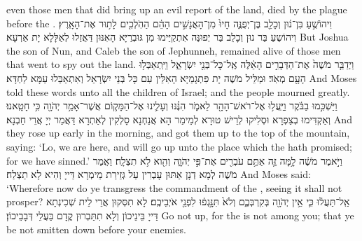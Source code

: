 {even those men that did bring up an evil report of the land, died by the plague before the \lord.}{}
{וִיהוֹשֻׁ֣עַ בִּן־נ֔וּן וְכָלֵ֖ב בֶּן־יְפֻנֶּ֑ה חָיוּ֙ מִן־הָאֲנָשִׁ֣ים הָהֵ֔ם הַהֹֽלְכִ֖ים לָת֥וּר אֶת־הָאָֽרֶץ׃
}
{וִיהוֹשֻעַ בַּר נוּן וְכָלֵב בַּר יְפוּנֶּה אִתְקַיַּימוּ מִן גּוּבְרַיָּא הָאִנּוּן דַּאֲזַלוּ לְאַלָּלָא יָת אַרְעָא׃}
{But Joshua the son of Nun, and Caleb the son of Jephunneh, remained alive of those men that went to spy out the land.}{}
{וַיְדַבֵּ֤ר מֹשֶׁה֙ אֶת־הַדְּבָרִ֣ים הָאֵ֔לֶּה אֶֽל־כׇּל־בְּנֵ֖י יִשְׂרָאֵ֑ל וַיִּֽתְאַבְּל֥וּ הָעָ֖ם מְאֹֽד׃}
{וּמַלֵּיל מֹשֶׁה יָת פִּתְגָמַיָּא הָאִלֵּין עִם כָּל בְּנֵי יִשְׂרָאֵל וְאִתְאַבַּלוּ עַמָּא לַחְדָּא׃}
{And Moses told these words unto all the children of Israel; and the people mourned greatly.}{}
{וַיַּשְׁכִּ֣מוּ בַבֹּ֔קֶר וַיַּֽעֲל֥וּ אֶל־רֹאשׁ־הָהָ֖ר לֵאמֹ֑ר הִנֶּ֗נּוּ וְעָלִ֛ינוּ אֶל־הַמָּק֛וֹם אֲשֶׁר־אָמַ֥ר יְהֹוָ֖ה כִּ֥י חָטָֽאנוּ׃
}
{וְאַקְדִּימוּ בְצַפְרָא וּסְלִיקוּ לְרֵישׁ טוּרָא לְמֵימַר הָא אֲנַחְנָא סָלְקִין לְאַתְרָא דַּאֲמַר יְיָ אֲרֵי חַבְנָא׃}
{And they rose up early in the morning, and got them up to the top of the mountain, saying: ‘Lo, we are here, and will go up unto the place which the \lord\space hath promised; for we have sinned.’}{}
{וַיֹּ֣אמֶר מֹשֶׁ֔ה לָ֥מָּה זֶּ֛ה אַתֶּ֥ם עֹבְרִ֖ים אֶת־פִּ֣י יְהֹוָ֑ה וְהִ֖וא לֹ֥א תִצְלָֽח׃
}
{וַאֲמַר מֹשֶׁה לְמָא דְנָן אַתּוּן עָבְרִין עַל גְּזֵירַת מֵימְרָא דַּייָ וְהִיא לָא תַצְלַח׃}
{And Moses said: ‘Wherefore now do ye transgress the commandment of the \lord, seeing it shall not prosper?}{}
{אַֽל־תַּעֲל֔וּ כִּ֛י אֵ֥ין יְהֹוָ֖ה בְּקִרְבְּכֶ֑ם וְלֹא֙ תִּנָּ֣גְפ֔וּ לִפְנֵ֖י אֹיְבֵיכֶֽם׃}
{לָא תִסְּקוּן אֲרֵי לֵית שְׁכִינְתָא דַּייָ בֵּינֵיכוֹן וְלָא תִתַּבְרוּן קֳדָם בַּעֲלֵי דְּבָבֵיכוֹן׃}
{Go not up, for the \lord\space is not among you; that ye be not smitten down before your enemies.}{}
